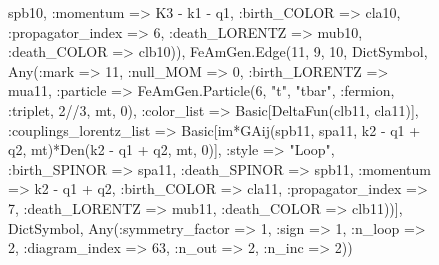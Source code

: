 \documentclass{revtex4}
\begin{document}
\begin{figure}[!htb]
\begin{center}
{spb10, :momentum => K3 - k1 - q1, :birth_COLOR => cla10, :propagator_index => 6, :death_LORENTZ => mub10, :death_COLOR => clb10)), FeAmGen.Edge(11, 9, 10, Dict{Symbol, Any}(:mark => 11, :null_MOM => 0, :birth_LORENTZ => mua11, :particle => FeAmGen.Particle(6, "t", "tbar", :fermion, :triplet, 2//3, mt, 0), :color_list => Basic[DeltaFun(clb11, cla11)], :couplings_lorentz_list => Basic[im*GAij(spb11, spa11, k2 - q1 + q2, mt)*Den(k2 - q1 + q2, mt, 0)], :style => "Loop", :birth_SPINOR => spa11, :death_SPINOR => spb11, :momentum => k2 - q1 + q2, :birth_COLOR => cla11, :propagator_index => 7, :death_LORENTZ => mub11, :death_COLOR => clb11))], Dict{Symbol, Any}(:symmetry_factor => 1, :sign => 1, :n_loop => 2, :diagram_index => 63, :n_out => 2, :n_inc => 2)) 
}
\end{center}
\end{figure}
\end{document}
